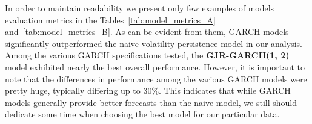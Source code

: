 
In order to maintain readability we present only few examples of models evaluation metrics in the Tables~\ref{tab:model_metrics_A} and~\ref{tab:model_metrics_B}. 
As can be evident from them, \textsc{GARCH} models significantly outperformed the naive volatility persistence model in our analysis. Among the various GARCH specifications tested, the \textbf{GJR-GARCH(1, 2)} model exhibited nearly the best overall performance. However, it is important to note that the differences in performance among the various GARCH models were pretty huge, typically differing up to 30\%. This indicates that while GARCH models generally provide better forecasts than the naive model, we still should dedicate some time when choosing the best model for our particular data.


